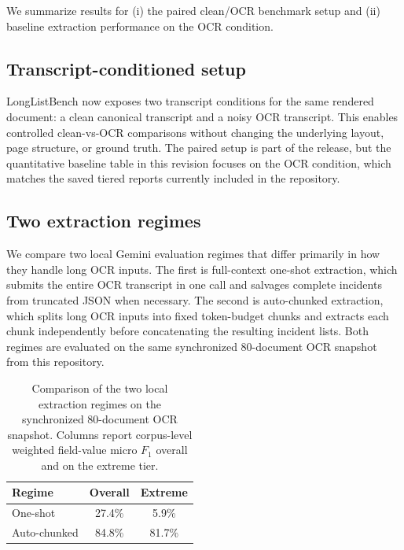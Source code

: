 We summarize results for (i) the paired clean/OCR benchmark setup and (ii) baseline extraction performance on the OCR condition.

\subsection{Transcript-conditioned setup}
LongListBench now exposes two transcript conditions for the same rendered document: a clean canonical transcript and a noisy OCR transcript. This enables controlled clean-vs-OCR comparisons without changing the underlying layout, page structure, or ground truth. The paired setup is part of the release, but the quantitative baseline table in this revision focuses on the OCR condition, which matches the saved tiered reports currently included in the repository.

\subsection{Two extraction regimes}
We compare two local Gemini evaluation regimes that differ primarily in how they handle long OCR inputs. The first is full-context one-shot extraction, which submits the entire OCR transcript in one call and salvages complete incidents from truncated JSON when necessary. The second is auto-chunked extraction, which splits long OCR inputs into fixed token-budget chunks and extracts each chunk independently before concatenating the resulting incident lists. Both regimes are evaluated on the same synchronized 80-document OCR snapshot from this repository.

\begin{table}[t]
\centering
\small
\caption{Comparison of the two local extraction regimes on the synchronized 80-document OCR snapshot. Columns report corpus-level weighted field-value micro $F_1$ overall and on the extreme tier.}
\label{tab:two-regimes}
\begin{tabular}{@{}lcc@{}}
\toprule
Regime & Overall & Extreme \\
\midrule
One-shot & 27.4\% & 5.9\% \\
Auto-chunked & 84.8\% & 81.7\% \\
\bottomrule
\end{tabular}
\end{table}

